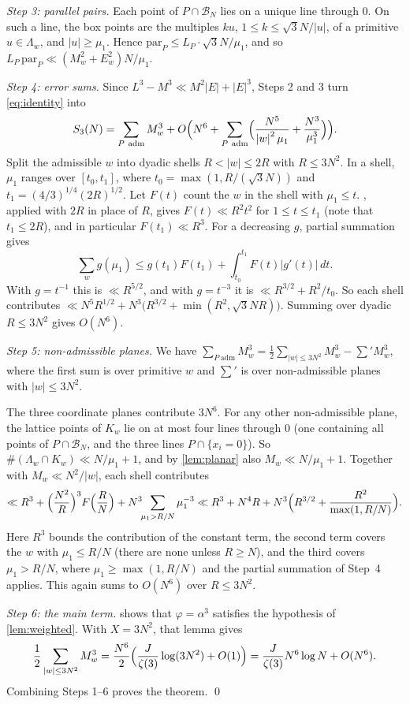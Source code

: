 \documentclass[11pt]{article}
\theoremstyle{definition}
\newcommand{\BN}{\mathcal{B}_N}
\newcommand{\abs}[1]{\left\lvert #1 \right\rvert}
\begin{document}
\emph{Step 3: parallel pairs.} Each point of $P\cap\BN$ lies on a unique line through $0$. On such a line, the box points are the multiples $ku$, $1\le k\le\sqrt3N/\abs u$, of a primitive $u\in\Lambda_w$, and $\abs u\ge\mu_1$. Hence $\mathrm{par}_P\le L_P\cdot\sqrt3N/\mu_1$, and so $L_P\,\mathrm{par}_P\ll(M_w^2+E_w^2)N/\mu_1$.

\emph{Step 4: error sums.} Since $L^3-M^3\ll M^2\abs E+\abs E^3$, Steps 2 and 3 turn \eqref{eq:identity} into
\[
S_3(N)=\sum_{P\ \text{adm}}M_w^3+O\Bigl(N^6+\sum_{P\ \text{adm}}\Bigl(\frac{N^5}{\abs w^2\mu_1}+\frac{N^3}{\mu_1^3}\Bigr)\Bigr).
\]
Split the admissible $w$ into dyadic shells $R<\abs w\le2R$ with $R\le3N^2$. In a shell, $\mu_1$ ranges over $[t_0,t_1]$, where $t_0=\max(1,R/(\sqrt3N))$ and $t_1=(4/3)^{1/4}(2R)^{1/2}$. Let $F(t)$ count the $w$ in the shell with $\mu_1\le t$. , applied with $2R$ in place of $R$, gives $F(t)\ll R^2t^2$ for $1\le t\le t_1$ (note that $t_1\le2R$), and in particular $F(t_1)\ll R^3$. For a decreasing $g$, partial summation gives
\[
\sum_{w}g(\mu_1)\le g(t_1)F(t_1)+\int_{t_0}^{t_1}F(t)\abs{g'(t)}\,dt.
\]
With $g=t^{-1}$ this is $\ll R^{5/2}$, and with $g=t^{-3}$ it is $\ll R^{3/2}+R^2/t_0$. So each shell contributes $\ll N^5R^{1/2}+N^3\bigl(R^{3/2}+\min(R^2,\sqrt3NR)\bigr)$. Summing over dyadic $R\le3N^2$ gives $O(N^6)$.

\emph{Step 5: non-admissible planes.} We have $\sum_{P\ \text{adm}}M_w^3=\frac12\sum_{\abs w\le3N^2}M_w^3-\sum'M_w^3$, where the first sum is over primitive $w$ and $\sum'$ is over non-admissible planes with $\abs w\le3N^2$.

The three coordinate planes contribute $3N^6$. For any other non-admissible plane, the lattice points of $K_w$ lie on at most four lines through $0$ (one containing all points of $P\cap\BN$, and the three lines $P\cap\{x_i=0\}$). So $\#(\Lambda_w\cap K_w)\ll N/\mu_1+1$, and by \cref{lem:planar} also $M_w\ll N/\mu_1+1$. Together with $M_w\ll N^2/\abs w$, each shell contributes
\[
\ll R^3+\Bigl(\frac{N^2}{R}\Bigr)^3F\Bigl(\frac RN\Bigr)+N^3\!\!\sum_{\mu_1>R/N}\mu_1^{-3}\ll R^3+N^4R+N^3\Bigl(R^{3/2}+\frac{R^2}{\max(1,R/N)}\Bigr).
\]
Here $R^3$ bounds the contribution of the constant term, the second term covers the $w$ with $\mu_1\le R/N$ (there are none unless $R\ge N$), and the third covers $\mu_1>R/N$, where $\mu_1\ge\max(1,R/N)$ and the partial summation of Step~4 applies. This again sums to $O(N^6)$ over $R\le3N^2$.

\emph{Step 6: the main term.}  shows that $\varphi=\alpha^3$ satisfies the hypothesis of \cref{lem:weighted}. With $X=3N^2$, that lemma gives
\[
\frac12\sum_{\abs w\le3N^2}M_w^3=\frac{N^6}{2}\Bigl(\frac{J}{\zeta(3)}\log(3N^2)+O(1)\Bigr)=\frac{J}{\zeta(3)}N^6\log N+O(N^6).
\]
Combining Steps 1--6 proves the theorem. \qed
\end{document}
